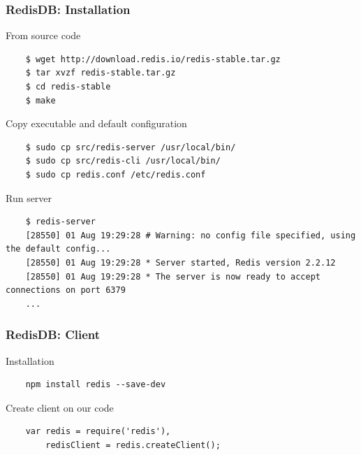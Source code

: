 \begin{frame}[fragile]
  \frametitle{RedisDB: Installation}

  \begin{block}{From source code}
    {\tiny
    \begin{verbatim}
    $ wget http://download.redis.io/redis-stable.tar.gz
    $ tar xvzf redis-stable.tar.gz
    $ cd redis-stable
    $ make
    \end{verbatim}
    }
  \end{block}

  \pause

  \begin{block}{Copy executable and default configuration}
    {\tiny
    \begin{verbatim}
    $ sudo cp src/redis-server /usr/local/bin/ 
    $ sudo cp src/redis-cli /usr/local/bin/ 
    $ sudo cp redis.conf /etc/redis.conf
    \end{verbatim}
    }
  \end{block}

  \pause

  \begin{block}{Run server}
    {\tiny
    \begin{verbatim}
    $ redis-server
    [28550] 01 Aug 19:29:28 # Warning: no config file specified, using the default config...
    [28550] 01 Aug 19:29:28 * Server started, Redis version 2.2.12
    [28550] 01 Aug 19:29:28 * The server is now ready to accept connections on port 6379
    ...
    \end{verbatim}
    }
  \end{block}
\end{frame}

\begin{frame}[fragile]
  \frametitle{RedisDB: Client}

  \begin{block}{Installation}
    {\tiny
    \begin{verbatim}
    npm install redis --save-dev
    \end{verbatim}
    }
  \end{block}

  \pause

  \begin{block}{Create client on our code}
    {\tiny
    \begin{verbatim}
    var redis = require('redis'),
        redisClient = redis.createClient();
    \end{verbatim}
    }
  \end{block}
\end{frame}

